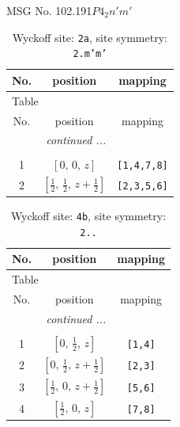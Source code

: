 \documentclass[fleqn,8pt]{jsarticle}
\begin{document}
\setcounter{MaxMatrixCols}{32}

\renewcommand{\tablename}{Table~}
\renewcommand{\figurename}{Figure~}
\begin{center}
\LARGE
MSG No. 102.191\quad$P4_{2}n'm'$
\end{center}
\renewcommand{\arraystretch}{1.2}
\begin{longtable}{ccc}
\caption{Wyckoff site: {\tt 2a}, site symmetry: {\tt 2.m'm'}}
 \\
 \hline \hline
No. & position & mapping \\ \hline \endfirsthead

\multicolumn{2}{l}{\tablename\ \thetable{}} \\
 \hline \hline
No. & position & mapping \\ \hline \endhead

 \hline \hline
\multicolumn{2}{r}{\footnotesize\it continued ...} \\ \endfoot

 \hline \hline
\multicolumn{2}{r}{} \\ \endlastfoot

1 & $\left[ 0,\, 0,\, z \right]$ & {\tt [1,4,7,8]} \\ \hline
2 & $\left[ \frac{1}{2},\, \frac{1}{2},\, z + \frac{1}{2} \right]$ & {\tt [2,3,5,6]} \\
\end{longtable}
\renewcommand{\arraystretch}{1.2}
\begin{longtable}{ccc}
\caption{Wyckoff site: {\tt 4b}, site symmetry: {\tt 2..}}
 \\
 \hline \hline
No. & position & mapping \\ \hline \endfirsthead

\multicolumn{2}{l}{\tablename\ \thetable{}} \\
 \hline \hline
No. & position & mapping \\ \hline \endhead

 \hline \hline
\multicolumn{2}{r}{\footnotesize\it continued ...} \\ \endfoot

 \hline \hline
\multicolumn{2}{r}{} \\ \endlastfoot

1 & $\left[ 0,\, \frac{1}{2},\, z \right]$ & {\tt [1,4]} \\ \hline
2 & $\left[ 0,\, \frac{1}{2},\, z + \frac{1}{2} \right]$ & {\tt [2,3]} \\ \hline
3 & $\left[ \frac{1}{2},\, 0,\, z + \frac{1}{2} \right]$ & {\tt [5,6]} \\ \hline
4 & $\left[ \frac{1}{2},\, 0,\, z \right]$ & {\tt [7,8]} \\
\end{longtable}
\end{document}
